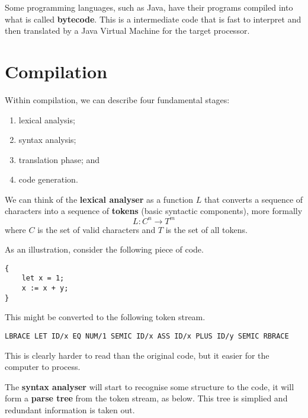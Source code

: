 Some programming languages, such as Java, have their programs compiled into what is called \textbf{bytecode}. This is a intermediate code that is fast to interpret and then translated by a Java Virtual Machine for the target processor.

\section{Compilation}

Within compilation, we can describe four fundamental stages:
\begin{enumerate}
    \item lexical analysis;
    \item syntax analysis; 
    \item translation phase; and
    \item code generation.
\end{enumerate}

\begin{definition}
    We can think of the \textbf{lexical analyser} as a function $L$ that converts a sequence of characters into a sequence of \textbf{tokens} (basic syntactic components), more formally \[ L : C^n \to T^m \] where $C$ is the set of valid characters and $T$ is the set of all tokens.
\end{definition}

\begin{example}
    As an illustration, consider the following piece of code.
    \begin{lstlisting}
{
    let x = 1;
    x := x + y;
}
    \end{lstlisting}
    This might be converted  to the following token stream.
    \begin{lstlisting}
LBRACE LET ID/x EQ NUM/1 SEMIC ID/x ASS ID/x PLUS ID/y SEMIC RBRACE
    \end{lstlisting}
    This is clearly harder to read than the original code, but it easier for the computer to process.
\end{example}

\begin{definition}
    The \textbf{syntax analyser} will start to recognise some structure to the code, it will form a \textbf{parse tree} from the token stream, as below. This tree is simplied and redundant information is taken out.
\end{definition}

